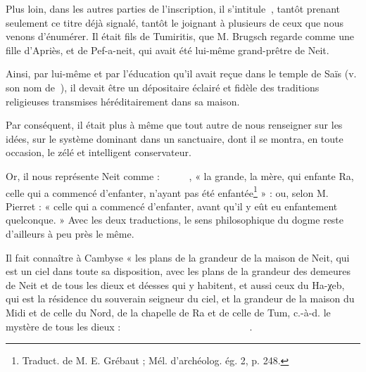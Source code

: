 \documentclass[letterpaper,twocolumn,openany,nodeprecatedcode]{dndbook}
\newcommand*\hieroAAAH{}
\newcommand*\hieroAAAO{}
\newcommand*\hieroAAAU{}
\newcommand*\hieroAAAX{}
\newcommand*\hieroAABC{\raisebox{0.5ex}{}}
\newcommand*\hieroAABR{}
\newcommand*\hieroAACM{}
\newcommand*\hieroAACN{\raisebox{1ex}{}}
\newcommand*\hieroAACS{}
\newcommand*\hieroAAEK{}
\newcommand*\hieroAAEZ{}
\newcommand*\hieroAAFW{}
\newcommand*\hieroAAHA{}
\newcommand*\hieroAAHN{}
\newcommand*\hieroAAHQ{}
\newcommand*\hieroAAHR{}
\newcommand*\hieroAAHU{}
\newcommand*\hieroAAHV{}
\newcommand*\hieroAAHW{}
\newcommand*\hieroAAHX{}
\newcommand*\hieroAAHY{}
\newcommand*\hieroAAHZ{}
\newcommand*\hieroAAIA{\raisebox{0.3ex}{}}
\newcommand*\hieroAAID{}
\newcommand*\hieroAAIE{}
\newcommand*\hieroAAIF{}
\newcommand*\hieroAAIG{}
\newcommand*\hieroAAIH{}
\newcommand*\hieroAAKN{}
\newcommand*\hieroAAKO{}
\newcommand*\hieroAANC{}
\newcommand*\hieroAAOX{}
\newcommand*\hieroAAPH{}
\newcommand*\hieroABAM{}
\newcommand*\hieroABAW{}
\newcommand*\hieroABBK{}
\newcommand*\hieroABBL{}
\newcommand*\hieroABBM{}
\newcommand*\hieroABBN{}
\newcommand*\hieroABBO{}
\begin{document}
Plus loin, dans les autres parties de l'inscription, il s'intitule $\hieroAAOX\:\hieroABAW$, tantôt prenant seulement ce titre déjà signalé, tantôt le joignant à plusieurs de ceux que nous venons d'énumérer. Il était fils de Tumiritis, que M. Brugsch regarde comme une fille d'Apriès, et de Pef-a-neit, qui avait été lui-même grand-prêtre de Neit.

Ainsi, par lui-même et par l'éducation qu'il avait reçue dans le temple de Saïs (v. son nom de $\hieroAAAX\:\hieroAAID$), il devait être un dépositaire éclairé et fidèle des traditions religieuses transmises héréditairement dans sa maison.

Par conséquent, il était plus à même que tout autre de nous renseigner sur les idées, sur le système dominant dans un sanctuaire, dont il se montra, en toute occasion, le zélé et intelligent conservateur.

Or, il nous représente Neit comme : $\hieroAAOX\:\hieroAAKO\:\hieroAANC\allowbreak\:\hieroAACS\:\hieroAAIF\:\hieroABAM\allowbreak\:\hieroAANC\:\hieroAACS\:\hieroAAAH\allowbreak\:\hieroAACM\:\hieroABBK\allowbreak\:\hieroAANC\:\hieroAACS$, « la grande, la mère, qui enfante Ra, celle qui a commencé d'enfanter, n'ayant pas été enfantée\footnote{Traduct. de M. E. Grébaut ; Mél. d'archéolog. ég. 2, p. 248.} » : ou, selon M. Pierret : « celle qui a commencé d'enfanter, avant qu'il y eût eu enfantement quelconque. » Avec les deux traductions, le sens philosophique du dogme reste d'ailleurs à peu près le même.

Il fait connaître à Cambyse « les plans de la grandeur de la maison de Neit, qui est un ciel dans toute sa disposition, avec les plans de la grandeur des demeures de Neit et de tous les dieux et déesses qui y habitent, et aussi ceux du Ha-χeb, qui est la résidence du souverain seigneur du ciel, et la grandeur de la maison du Midi et de celle du Nord, de la chapelle de Ra et de celle de Tum, c.-à-d. le mystère de tous les dieux : $\hieroAACS\:\hieroAAHR\:\hieroABBL\allowbreak\:\hieroABBM\:\hieroAAHQ\:\hieroAABR\allowbreak\:\hieroAACS\:\hieroAAHR\:\hieroAACS\allowbreak\:\hieroAABC\:\hieroAAEZ\:\hieroAAKN\allowbreak\:\hieroAACS\:\hieroAAHR\:\hieroABBL\allowbreak\:\hieroAACN\:\hieroAAAO\:\hieroAAHA\allowbreak\:\hieroAAEK\:\hieroAAEK\:\hieroAAEK\allowbreak\:\hieroAAHV\:\hieroAABC\:\hieroAAAH\allowbreak\:\hieroAAHW\:\hieroAAHX\:\hieroAAAH\allowbreak\:\hieroAACS\:\hieroAAEZ\:\hieroAAKN\allowbreak\:\hieroAACS\:\hieroAAHR\allowbreak\:\hieroABBL\:\hieroAACN\:\hieroAAFW\allowbreak\:\hieroAAHY\:\hieroAAAU\:\hieroAAHZ\allowbreak\:\hieroAAIA\:\hieroABBN\allowbreak\:\hieroAABC\:\hieroAAPH\:\hieroAAEZ\allowbreak\:\hieroAAKN\:\hieroAACS\:\hieroAAHR\allowbreak\:\hieroAAHU\:\hieroAAAX\:\hieroAAID\allowbreak\:\hieroAAIE\:\hieroAAHN\:\hieroAAIF\allowbreak\:\hieroAAHN\:\hieroAAIG\:\hieroAAIH\allowbreak\:\hieroAAHZ\:\hieroABBO\:\hieroAABC$.
\end{document}

